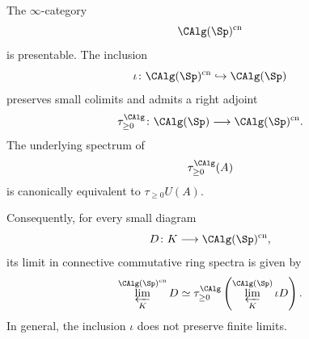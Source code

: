 \begin{proposition}
\label{prop:connective-calg-presentable}
The $\infty$-category
\[
    \CAlg(\Sp)^{\mathrm{cn}}
\]
is presentable. The inclusion
\[
    \iota
    \colon
    \CAlg(\Sp)^{\mathrm{cn}}
    \hookrightarrow
    \CAlg(\Sp)
\]
preserves small colimits and admits a right adjoint
\[
    \tau_{\geq0}^{\CAlg}
    \colon
    \CAlg(\Sp)
    \longrightarrow
    \CAlg(\Sp)^{\mathrm{cn}}.
\]
The underlying spectrum of
\[
    \tau_{\geq0}^{\CAlg}(A)
\]
is canonically equivalent to $\tau_{\geq0}U(A)$.

Consequently, for every small diagram
\[
    D
    \colon
    K
    \longrightarrow
    \CAlg(\Sp)^{\mathrm{cn}},
\]
its limit in connective commutative ring spectra is given by
\[
    \varprojlim_K^{\CAlg(\Sp)^{\mathrm{cn}}}D
    \simeq
    \tau_{\geq0}^{\CAlg}
    \left(
        \varprojlim_K^{\CAlg(\Sp)}
        \iota D
    \right).
\]
In general, the inclusion $\iota$ does not preserve finite limits.
\end{proposition}

